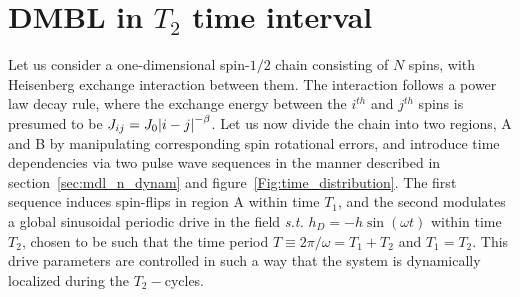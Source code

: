 \documentclass[12pt]{iopart}
\begin{document}
\medskip

\clearpage

\appendix
\section{\label{sec:AppendixA} DMBL in $T_2$ time interval}

Let us consider a one-dimensional spin-$1/2$ chain consisting of $N$ spins, with Heisenberg exchange interaction between them. The interaction follows a power law decay rule, where the exchange energy between the $i^{th}$ and $j^{th}$ spins is presumed to be  $J_{ij}=J_0\abs{i-j}^{-\beta}$. Let us now  divide the chain into two regions, A and B by manipulating corresponding spin rotational errors, and introduce time dependencies via two pulse wave sequences in the manner described in section~\ref{sec:mdl_n_dynam} and figure~\ref{Fig:time_distribution}. The first sequence  induces spin-flips in region A within time $T_1$, and the second modulates a global sinusoidal periodic drive in the field \textit{s.t.} $h_D = -h\sin(\omega t)$ within time $T_2$, chosen to be such that the time period $T\equiv 2\pi/\omega = T_1 + T_2$ and $T_1 = T_2$. This drive parameters are controlled in such a way that the system is dynamically localized during the $T_2-$cycles.
\end{document}
